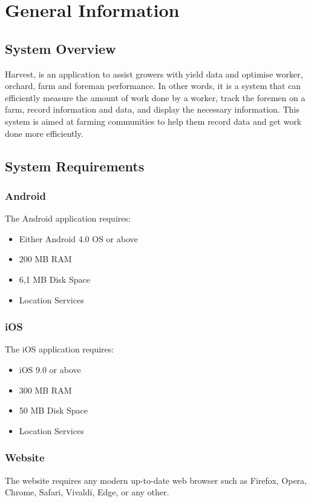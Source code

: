 \documentclass[11pt]{article}
\begin{document}
\newpage
{}
\tableofcontents
\newpage
\listoffigures

\newpage
{}

\section{General Information}
\subsection{System Overview}
Harvest, is an application to assist growers with yield data and optimise worker, orchard, farm and foreman performance. In other words, it is a system that can efficiently measure the amount of work done by a worker, track the foremen on a farm, record information and data, and display the necessary information. This system is aimed at farming communities to help them record data and get work done more efficiently.

\subsection{System Requirements}
\subsubsection{Android}
The Android application requires:
\begin{itemize}
 \item Either Android 4.0 OS or above
\item 200 MB RAM
\item 6,1 MB Disk Space
	\item Location Services
\end{itemize}
\subsubsection{iOS}
The iOS application requires:
\begin{itemize}
 \item iOS 9.0 or above
 \item 300 MB RAM
 \item 50 MB Disk Space
 \item Location Services
\end{itemize}
\subsubsection{Website}
The website requires any modern up-to-date web browser such as Firefox, Opera, Chrome, Safari, Vivaldi, Edge, or any other.
\end{document}
